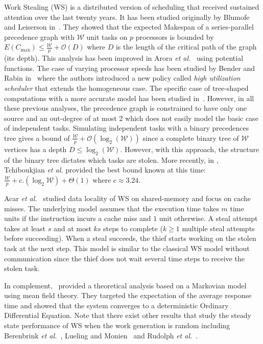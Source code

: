 Work Stealing (WS) is a distributed version of scheduling that received sustained attention over the last twenty years. 
It has been studied originally by Blumofe and Leiserson
in~\cite{Blumofe1999}.  They showed that the expected Makespan of a
series-parallel precedence graph with $\mathcal{W}$ unit tasks on $p$
processors is bounded by
$E(C_{\max}) \leq \frac{\mathcal{W}}{p}+\mathcal{O}(D)$ where $D$ is
the length of the critical path of the graph (its depth).  This
analysis has been improved in Arora \textit{et al.}~\cite{Arora2001}
using potential functions.  The case of varying processor speeds has
been studied by Bender and Rabin in~\cite{Bender2002} where the
authors introduced a new policy called \textit{high utilization
  scheduler} that extends the homogeneous case.  The specific case of
tree-shaped computations with a more accurate model has been studied
in~\cite{Sanders1999}.  However, in all these previous analyses, the
precedence graph is constrained to have only one source and an
out-degree of at most 2 which does not easily model the basic case of
independent tasks.  Simulating independent tasks with a binary
precedences tree gives a bound of
$\frac{\mathcal{W}}{p}+\mathcal{O}(\log_2 (\mathcal{W}))$ since a
complete binary tree of $\mathcal{W}$ vertices has a depth
$D \leq \log_2 (\mathcal{W})$.  However, with this approach, the
structure of the binary tree dictates which tasks are stolen. More
recently, in \cite{Denis2013}, Tchiboukjian \textit{et al.} provided
the best bound known at this time:
$\frac{\mathcal{W}}{p}+c.(\log_2 \mathcal{W})+\Theta(1)$ where
$c\approx3.24$.

Acar \emph{et al.}~\cite{Acar2000,Acar2002} studied data locality of
WS on shared-memory and focus on cache misses.  The underlying model
assumes that the execution time takes $m$ time units if the
instruction incurs a cache miss and $1$ unit otherwise.  A steal
attempt takes at least $s$ and at most $ks$ steps to complete ($k\ge1$
multiple steal attempts before succeeding).  When a steal succeeds,
the thief starts working on the stolen task at the next step.  This
model is similar to the classical WS model without communication since
the thief does not wait several time steps to receive the stolen task.

In complement,~\cite{Gast2010,Mitzenmache1998} provided a theoretical
analysis based on a Markovian model using mean field theory. They
targeted the expectation of the average response time and showed that
the system converges to a deterministic Ordinary Differential
Equation.  Note that there exist other results that study the steady
state performance of WS when the work generation is random including
Berenbrink \textit{et al.}~\cite{Berenbrink2003}, Lueling and
Monien~\cite{Lueling1993} and Rudolph \textit{et al.}~\cite{Rudolph1991}.  

